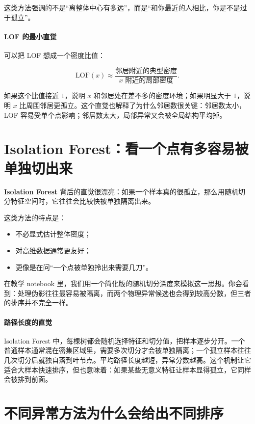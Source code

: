 这类方法强调的不是“离整体中心有多远”，而是“和你最近的人相比，你是不是过于孤立”。

\paragraph{LOF 的最小直觉}

可以把 LOF 想成一个密度比值：

\[
\mathrm{LOF}(x)
\approx
\frac{\text{邻居附近的典型密度}}
{\text{\(x\) 附近的局部密度}}.
\]

如果这个比值接近 \(1\)，说明 \(x\) 和邻居处在差不多的密度环境；如果明显大于 \(1\)，说明 \(x\) 比周围邻居更孤立。这个直觉也解释了为什么邻居数很关键：邻居数太小，LOF 容易受单个点影响；邻居数太大，局部异常又会被全局结构平均掉。

\section{Isolation Forest：看一个点有多容易被单独切出来}

\textbf{Isolation Forest} 背后的直觉很漂亮：如果一个样本真的很孤立，那么用随机切分特征空间时，它往往会比较快被单独隔离出来。

这类方法的特点是：

\begin{itemize}
    \item 不必显式估计整体密度；
    \item 对高维数据通常更友好；
    \item 更像是在问“一个点被单独拎出来需要几刀”。
\end{itemize}

在教学 notebook 里，我们用一个简化版的随机切分深度来模拟这一思想。你会看到：处理伪影往往最容易被隔离，而两个物理异常候选也会得到较高分数，但三者的排序并不完全一样。

\paragraph{路径长度的直觉}

Isolation Forest 中，每棵树都会随机选择特征和切分值，把样本逐步分开。一个普通样本通常混在密集区域里，需要多次切分才会被单独隔离；一个孤立样本往往几次切分后就独自落到叶节点。平均路径长度越短，异常分数越高。这个机制让它适合大样本快速排序，但也意味着：如果某些无意义特征让样本显得孤立，它同样会被排到前面。

\section{不同异常方法为什么会给出不同排序}


